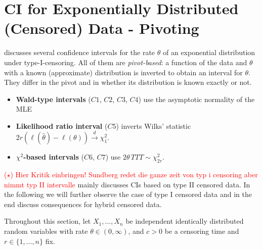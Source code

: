 
\chapter{CI for Exponentially Distributed (Censored) Data - Pivoting} \label{section:sundberg}


\cite{Sundberg2001} discusses several confidence intervals for the rate $\theta$
of an exponential distribution under type-I-censoring. All of them are
\emph{pivot-based}: a function of the data and $\theta$ with a known
(approximate) distribution is inverted to obtain an interval for $\theta$.
They differ in the pivot and in whether its distribution is known exactly or not.
\begin{itemize}
	\item \textbf{Wald-type intervals} ($C1$, $C2$, $C3$, $C4$) use the asymptotic normality
	of the MLE
	\item \textbf{Likelihood ratio interval} ($C5$) inverts Wilks' statistic
	$2r \left( \ell (\hat \theta) - \ell ( \theta) \right)\overset{d}{\longrightarrow}\chi^2_1$.
	\item \textbf{$\chi^2$-based intervals} ($C6$, $C7$) use
	$2\theta\,TTT\sim\chi^2_{2r}$.
\end{itemize}

\textcolor{red}{($\star$) Hier Kritik einbringen! Sundberg redet die ganze zeit von typ i censoring aber nimmt typ II intervalle}
\cite{Sundberg2001} mainly discusses CIs based on type II censored data. In the following we will further observe the case of type I censored data and in the end discuss consequences for hybrid censored data.


Throughout this section, let $X_1, \ldots , X_n$ be independent identically distributed random variables with rate $\theta \in (0, \infty)$, and $c>0$ be a censoring time and $r \in \{1, \ldots , n\}$ fix.

